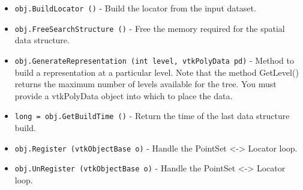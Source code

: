 \begin{itemize}
\item  \verb|obj.BuildLocator ()| -  Build the locator from the input dataset.

\item  \verb|obj.FreeSearchStructure ()| -  Free the memory required for the spatial data structure.

\item  \verb|obj.GenerateRepresentation (int level, vtkPolyData pd)| -  Method to build a representation at a particular level. Note that the 
 method GetLevel() returns the maximum number of levels available for
 the tree. You must provide a vtkPolyData object into which to place the 
 data.

\item  \verb|long = obj.GetBuildTime ()| -  Return the time of the last data structure build.

\item  \verb|obj.Register (vtkObjectBase o)| -  Handle the PointSet <-> Locator loop.

\item  \verb|obj.UnRegister (vtkObjectBase o)| -  Handle the PointSet <-> Locator loop.

\end{itemize}
